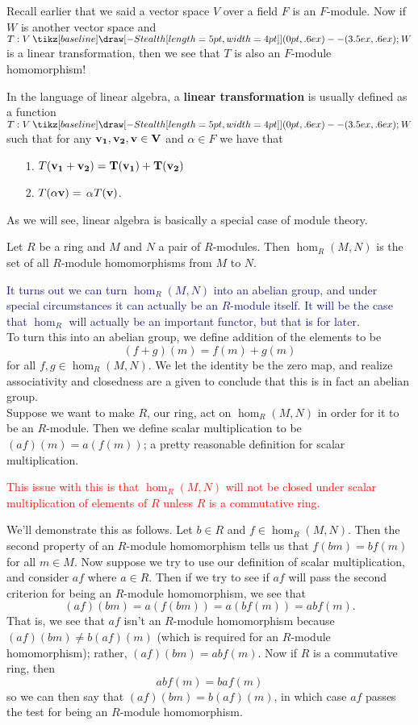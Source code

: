 \documentclass[12pt,letterpaper]{algebra_book}
\renewcommand{\to}{\mathbin{\tikz[baseline] \draw[-{Stealth[length=5pt,width=4pt]}] (0pt,.6ex) -- (3.5ex,.6ex);}}
\theoremstyle{definition}
\begin{document}
Recall earlier that we said a vector space $V$ over a field $F$ is
an $F$-module. Now if $W$ is another vector space and $T: V \to W$
is a linear transformation, then we see that $T$ is also an
$F$-module homomorphism! 

In the language of linear algebra, a
\textbf{linear transformation} is usually defined as a function
$T: V \to W$ such that for any $\bf{v}_1, \bf{v}_2, \bf{v} \in V$ and
$\alpha \in F$ we have that 
\begin{itemize}
    \item[1.] $T(\bf{v}_1 + \bf{v}_2) = T(\bf{v}_1) + T(\bf{v}_2)$
    \item[2.] $T(\alpha\bf{v}) = $ $\alpha$$T(\bf{v})$. 
\end{itemize}
As we will see, linear algebra is basically a special case of
module theory. 

\begin{definition}
    Let $R$ be a ring and $M$ and $N$ a pair of $R$-modules. Then
    $\hom_R(M,N)$ is the set of all $R$-module homomorphisms from
    $M$ to $N$. 
\end{definition}

\textcolor{MidnightBlue}{It turns out we can turn $\hom_R(M,N)$
into an abelian group, and under special circumstances it can
actually be an $R$-module itself. It will be the case
that $\hom_R$ will actually be an important functor, but that is
for later.}
\\
\indent To turn this into an abelian group, we define addition of
the elements to be 
\[
    (f + g)(m) = f(m) + g(m)
\]
for all $f, g \in \hom_R(M, N)$. We let the identity be the
zero map, and realize associativity and closedness are a given to
conclude that this is in fact an abelian group. 
\\

Suppose we want to make $R$, our ring, act on $\hom_R(M, N)$ in
order for it to be an $R$-module. Then we define scalar
multiplication to be $(af)(m) = a(f(m))$; a pretty reasonable
definition for scalar multiplication. 

\textcolor{Red}{This issue with this is that $\hom_R(M, N)$ will
not be closed under scalar multiplication of elements of $R$
unless $R$ is a commutative ring.
}

We'll demonstrate this as follows. Let $b \in R$ and
$f \in \hom_R(M, N)$. Then the second property of an $R$-module
homomorphism tells us that $f(bm) = bf(m)$ for all $m \in
M$. Now suppose we try to use our definition of scalar
multiplication, and consider $af$ where $a \in R$. Then if we try
to see if $af$ will pass the second criterion for being an
$R$-module homomorphism, we see that 
\[
    (af)(bm) = a(f(bm)) = a(bf(m)) = abf(m).
\]
That is, we see that $af$ isn't an $R$-module homomorphism because
$(af)(bm) \ne b(af)(m)$ (which is required for an $R$-module homomorphism); rather, $(af)(bm) = abf(m).$ Now if $R$
is a commutative ring, then 
\[
    abf(m) = baf(m)
\]
so we can then say that $(af)(bm) = b(af)(m)$, in which case $af$
passes the test for being an $R$-module homomorphism. 
\end{document}
